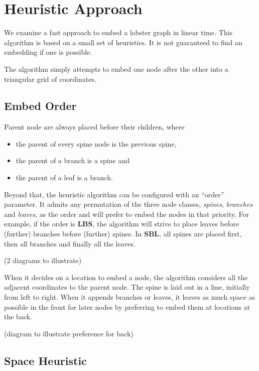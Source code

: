 \documentclass{article}
\begin{document}
\section{Heuristic Approach}

We examine a fast approach to embed a lobster graph in linear time.
This algorithm is based on a small set of heuristics.
It is not guaranteed to find an embedding if one is possible.

The algorithm simply attempts to embed one node after the other into a triangular grid of coordinates.

\subsection{Embed Order}

Parent node are always placed before their children, where

\begin{itemize}
    \item the parent of every spine node is the previous spine,
    \item the parent of a branch is a spine and
    \item the parent of a leaf is a branch.
\end{itemize}

Beyond that, the heuristic algorithm can be configured with an ``order'' parameter.
It admits any permutation of the three node classes, \emph{spines}, \emph{branches} and \emph{leaves}, as the order and will prefer to embed the nodes in that priority.
For example, if the order is \textbf{LBS}, the algorithm will strive to place leaves before (further) branches before (further) spines. In \textbf{SBL}, all spines are placed first, then all branches and finally all the leaves.

(2 diagrams to illustrate)

When it decides on a location to embed a node, the algorithm considers all the adjacent coordinates to the parent node.
The spine is laid out in a line, initially from left to right.
When it appends branches or leaves, it leaves as much space as possible in the front for later nodes by preferring to embed them at locations at the back.

(diagram to illustrate preference for back)

\subsection{Space Heuristic}
\end{document}
